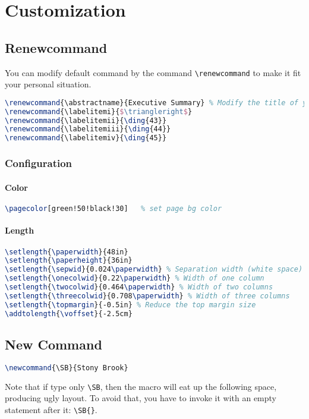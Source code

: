 \chapter{Customization}

\section{Renewcommand}
You can modify default command by the command \verb|\renewcommand| to make
it fit your personal situation.
\begin{lstlisting}[language=TeX]
\renewcommand{\abstractname}{Executive Summary}	% Modify the title of your abstract
\renewcommand{\labelitemi}{$\triangleright$}
\renewcommand{\labelitemii}{\ding{43}}
\renewcommand{\labelitemiii}{\ding{44}}
\renewcommand{\labelitemiv}{\ding{45}}
\end{lstlisting}

\subsection{Configuration}

\subsubsection{Color}
\begin{lstlisting}[language=TeX]
\pagecolor[green!50!black!30]	% set page bg color
\end{lstlisting}
\subsubsection{Length}
\begin{lstlisting}[language=TeX]
\setlength{\paperwidth}{48in} 
\setlength{\paperheight}{36in}
\setlength{\sepwid}{0.024\paperwidth} % Separation width (white space) between columns
\setlength{\onecolwid}{0.22\paperwidth} % Width of one column
\setlength{\twocolwid}{0.464\paperwidth} % Width of two columns
\setlength{\threecolwid}{0.708\paperwidth} % Width of three columns
\setlength{\topmargin}{-0.5in} % Reduce the top margin size
\addtolength{\voffset}{-2.5cm}
\end{lstlisting}

\section{New Command}
\begin{lstlisting}[language=TeX]
\newcommand{\SB}{Stony Brook}
\end{lstlisting}
Note that if type only \verb|\SB|, then the macro will eat up the following
space, producing ugly layout. To avoid that, you have to invoke it with an
empty statement after it: \verb|\SB{}|. 

